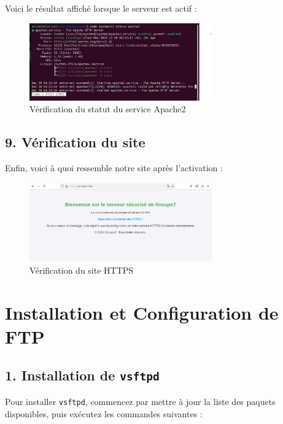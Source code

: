 Voici le résultat affiché lorsque le serveur est actif :

\begin{figure}[h]
	\centering
	\includegraphics[width=0.7\textwidth]{HTTPS/status.png}
	\caption{Vérification du statut du service Apache2}
	\label{fig:status}
\end{figure}

\subsection*{9. Vérification du site}
Enfin, voici à quoi ressemble notre site après l'activation :

\begin{figure}[h]
	\centering
	\includegraphics[width=0.7\textwidth]{HTTPS/test1.png}
	\caption{Vérification du site HTTPS}
	\label{fig:test1}
\end{figure}

\newpage







\section{Installation et Configuration de FTP}

\subsection*{1. Installation de \texttt{vsftpd}}
Pour installer \texttt{vsftpd}, commencez par mettre \`a jour la liste des paquets disponibles, puis ex\'ecutez les commandes suivantes :

